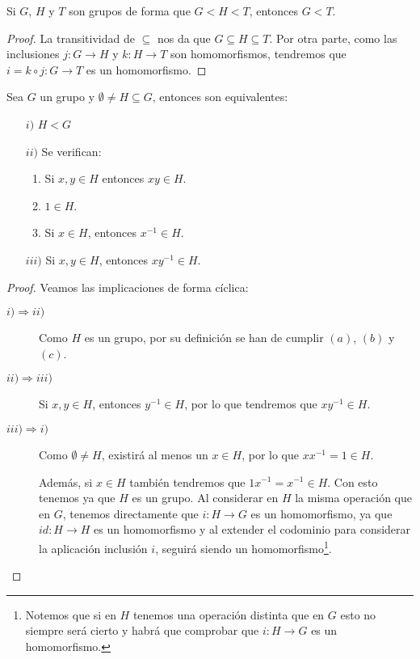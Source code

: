 \begin{observacion}
    Si $G$, $H$ y $T$ son grupos de forma que $G < H < T$, entonces $G < T$.
    \begin{proof}
        La transitividad de $\subseteq $ nos da que $G\subseteq H\subseteq T$. Por otra parte, como las inclusiones $j:G\to H$ y $k:H\to T$ son homomorfismos, tendremos que $i=k\circ j:G\to T$ es un homomorfismo.
    \end{proof}
\end{observacion}

\begin{prop}\label{prop:carac_subgrupo}
    Sea $G$ un grupo y $\emptyset \neq H \subseteq G$, entonces son equivalentes:
    \begin{enumerate}
        \item[$i)$] $H < G$
        \item[$ii)$] Se verifican:
            \begin{enumerate}[label=(\alph*)]
                \item Si $x,y\in H$ entonces $xy\in H$.
                \item $1\in H$.
                \item Si $x\in H$, entonces $x^{-1}\in H$.
            \end{enumerate}
        \item[$iii)$] Si $x,y\in H$, entonces $xy^{-1}\in H$.
    \end{enumerate}
    \begin{proof}
        Veamos las implicaciones de forma cíclica:
        \begin{description}
            \item [$i)\Longrightarrow ii)$] Como $H$ es un grupo, por su definición se han de cumplir $(a)$, $(b)$ y $(c)$.
            \item [$ii)\Longrightarrow iii)$] Si $x,y\in H$, entonces $y^{-1}\in H$, por lo que tendremos que $xy^{-1}\in H$.
            \item [$iii)\Longrightarrow i)$] Como $\emptyset \neq H$, existirá al menos un $x\in H$, por lo que $xx^{-1} = 1 \in H$.

                Además, si $x\in H$ también tendremos que $1x^{-1} = x^{-1}\in H$. Con esto tenemos ya que $H$ es un grupo. Al considerar en $H$ la misma operación que en $G$, tenemos directamente que $i:H\to G$ es un homomorfismo, ya que $id:H\to H$ es un homomorfismo y al extender el codominio para considerar la aplicación inclusión $i$, seguirá siendo un homomorfismo\footnote{Notemos que si en $H$ tenemos una operación distinta que en $G$ esto no siempre será cierto y habrá que comprobar que $i:H\to G$ es un homomorfismo.}.
        \end{description}
    \end{proof}
\end{prop}

